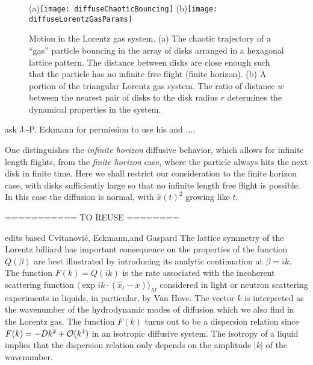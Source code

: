 

\begin{figure}[htbp]
  \begin{center}
    (a)\texttt{[image: diffuseChaoticBouncing]}
    (b)\texttt{[image: diffuseLorentzGasParams]}
  \end{center}
  \caption[]{\label{fig-chaoticBouncing}
  Motion in the Lorentz gas system. (a)  The chaotic trajectory of a
  ``gas'' particle bouncing in the array of disks  arranged in a
  hexagonal lattice pattern. The distance between disks are close  enough
  such that the particle has no infinite free flight (finite horizon).
  (b) A portion of the triangular Lorentz gas    system. The ratio of
  distance $w$ between the nearest pair of disks to the    disk radius
  $r$ determines the dynamical properties in the system.
  }
\end{figure}
    {ask J.-P. Eckmann for permission to use his
     and ....}



One distinguishes
the {\em infinite horizon} diffusive behavior, which allows for infinite
length flights, from
the {\em finite horizon} case, where the particle always
hits the next disk in finite time.
Here we shall restrict
our consideration to the finite horizon case,
with disks sufficiently
large so that no infinite length free flight is possible.
In this case the diffusion is normal, with $\hat{x}(t)^2$
growing like $t$.






\bigskip
=========== TO REUSE ========

    {edits based Cvitanovi\'c,  Eckmann,and Gaspard}
The lattice symmetry of the Lorentz billiard has important consequence on
the properties of the function $Q(\beta)$ are best illustrated by
introducing its analytic continuation at $\beta = i k$.  The function
$F(k)=Q(ik)$ is the rate associated with the incoherent scattering
function $\langle \exp i k \cdot (\hat x_t - x) \rangle_M$ considered in
light or neutron scattering experiments in liquids, in particular, by Van
Hove. The vector $k$ is interpreted as the
wavenumber of the hydrodynamic modes of diffusion which we also find in
the Lorentz gas.  The function $F(k)$ turns out to be a dispersion
relation since $F(k)=-D k^2 + {\cal O}(k^4)$ in an isotropic diffusive
system.  The isotropy of a liquid implies that the dispersion relation
only depends on the amplitude $\vert k\vert$ of the wavenumber.


